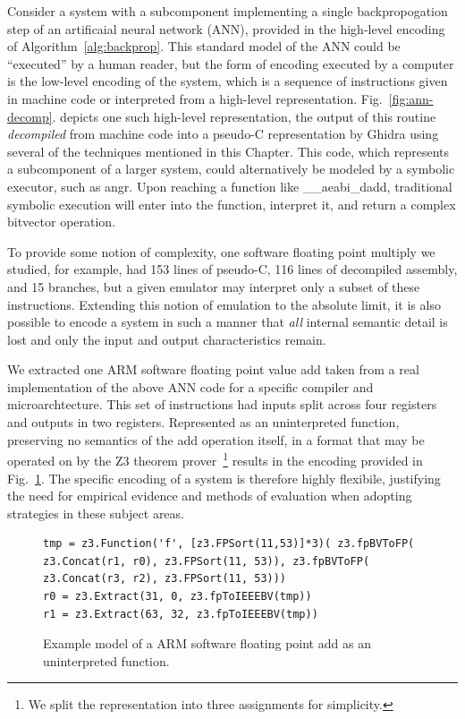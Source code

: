 

\begin{example}
Consider a system with a subcomponent implementing a single backpropogation step of an artificaial neural network (ANN), provided in the high-level encoding of Algorithm~\ref{alg:backprop}.
This standard model of the ANN could be ``executed'' by a human reader, but the form of encoding executed by a computer is the low-level encoding of the system, which is a sequence of instructions given in machine code or interpreted from a high-level representation.
Fig.~\ref{fig:ann-decomp}. depicts one such high-level representation, the output of this routine \emph{decompiled} from machine code into a pseudo-C representation by Ghidra using several of the techniques mentioned in this Chapter.
This code, which represents a subcomponent of a larger system, could alternatively be modeled by a symbolic executor, such as angr.
Upon reaching a function like \_\_aeabi\_dadd, traditional symbolic execution will enter into the function, interpret it, and return a complex bitvector operation.

To provide some notion of complexity, one software floating point multiply we studied, for example, had 153 lines of pseudo-C, 116 lines of decompiled assembly, and 15 branches, but a given emulator may interpret only a subset of these instructions.
Extending this notion of emulation to the absolute limit, it is also possible to encode a system in such a manner that \emph{all} internal semantic detail is lost and only the input and output characteristics remain.

We extracted one ARM software floating point value add taken from a real implementation of the above ANN code for a specific compiler and microarchtecture.
This set of instructions had inputs split across four registers and outputs in two registers.
	Represented as an uninterpreted function, preserving no semantics of the add operation itself, in a format that may be operated on by the Z3 theorem prover~\cite{zthree}\footnote{We split the representation into three assignments for simplicity.} results in the encoding provided in Fig.~\ref{fig:ann-spec}.
The specific encoding of a system is therefore highly flexibile, justifying the need for empirical evidence and methods of evaluation when adopting strategies in these subject areas.

\begin{figure}
  \begin{lstlisting}
tmp = z3.Function('f', [z3.FPSort(11,53)]*3)( z3.fpBVToFP( z3.Concat(r1, r0), z3.FPSort(11, 53)), z3.fpBVToFP( z3.Concat(r3, r2), z3.FPSort(11, 53)))
r0 = z3.Extract(31, 0, z3.fpToIEEEBV(tmp))
r1 = z3.Extract(63, 32, z3.fpToIEEEBV(tmp))
  \end{lstlisting}
	\caption{Example model of a ARM software floating point add as an uninterpreted function.}
  \label{fig:ann-spec}
\end{figure}

\end{example}


